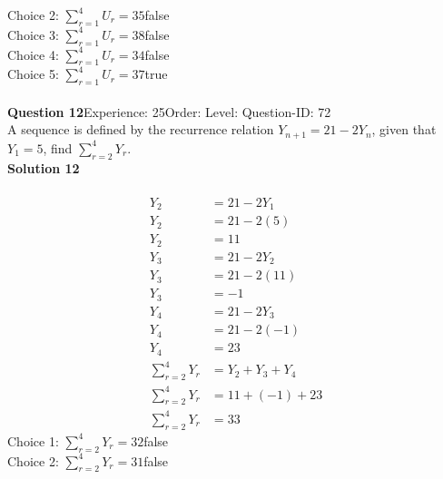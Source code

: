 \documentclass{article}
\begin{document}
Choice 2: \hspace{20pt}$\displaystyle\sum_{r=1}^{4} U_r=35$\hspace{20pt}false\\
Choice 3: \hspace{20pt}$\displaystyle\sum_{r=1}^{4} U_r=38$\hspace{20pt}false\\
Choice 4: \hspace{20pt}$\displaystyle\sum_{r=1}^{4} U_r=34$\hspace{20pt}false\\
Choice 5: \hspace{20pt}$\displaystyle\sum_{r=1}^{4} U_r=37$\hspace{20pt}true\\
\\[4pt]
\noindent\textbf{Question 12}\hspace{20pt}Experience: 25\hspace{20pt}Order: \hspace{20pt}Level: \hspace{20pt}Question-ID: 72\\[2pt]
A sequence is defined by the recurrence relation $Y_{n+1}=21-2Y_n$, given that  $Y_1 =5$, find $\displaystyle\sum_{r=2}^{4} Y_r$.\\[4pt]
\noindent\textbf{Solution 12}\\[2pt]
\\[-35pt]\begin{align*}
Y_2&=21-2Y_1\\[2pt]
Y_2&=21-2(5)\\[2pt]
Y_2&=11\\[12pt]
Y_3&=21-2Y_2\\[2pt]
Y_3&=21-2(11)\\[2pt]
Y_3&=-1\\[12pt]
Y_4&=21-2Y_3\\[2pt]
Y_4&=21-2(-1)\\[2pt]
Y_4&=23\\[12pt]
\displaystyle\sum_{r=2}^{4} Y_r&=Y_2+Y_3+Y_4\\[2pt]
\displaystyle\sum_{r=2}^{4} Y_r&=11+(-1)+23\\[2pt]
\displaystyle\sum_{r=2}^{4} Y_r&=33
\end{align*}
Choice 1: \hspace{20pt}$\displaystyle\sum_{r=2}^{4} Y_r=32$\hspace{20pt}false\\
Choice 2: \hspace{20pt}$\displaystyle\sum_{r=2}^{4} Y_r=31$\hspace{20pt}false\\
\end{document}
